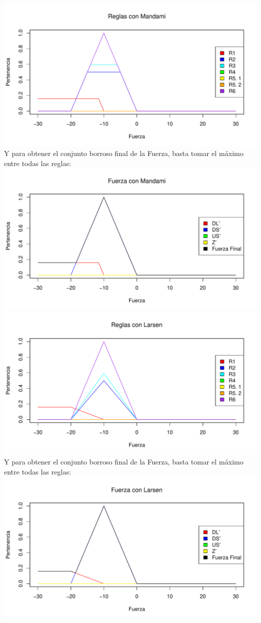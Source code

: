 \documentclass[
]{article}
\begin{document}
\includegraphics{tareaBloque3_files/figure-latex/unnamed-chunk-14-1.pdf}
Y para obtener el conjunto borroso final de la Fuerza, basta tomar el
máximo entre todas las reglas:
\includegraphics{tareaBloque3_files/figure-latex/unnamed-chunk-15-1.pdf}
\includegraphics{tareaBloque3_files/figure-latex/unnamed-chunk-16-1.pdf}
Y para obtener el conjunto borroso final de la Fuerza, basta tomar el
máximo entre todas las reglas:
\includegraphics{tareaBloque3_files/figure-latex/unnamed-chunk-17-1.pdf}
\end{document}

